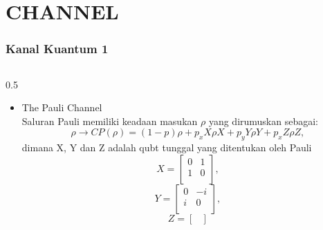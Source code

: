 \section{CHANNEL} %

\begin{frame}
    \frametitle{Kanal Kuantum 1}
  \begin{columns} %
    \begin{column}{0.5\textwidth}\vspace{-0.5cm}
      \justifying %
      \small %
        \begin{itemize}
            \item The Pauli Channel\\
                \fontsize{4}{6}\selectfont \justifying
                Saluran Pauli memiliki keadaan masukan $\rho$ yang dirumuskan sebagai:
                    \begin{equation}
                        \rho \rightarrow CP(\rho) = (1 - p)\rho + p_x X\rho X + p_y Y\rho Y + p_x Z\rho Z,
                    \end{equation}
                dimana X, Y dan Z adalah qubt tunggal yang ditentukan oleh Pauli  
                    \begin{equation}
                        X = \begin{bmatrix}
                        0 & 1 \\
                        1 & 0 \\
                        \end{bmatrix},
                    \end{equation}
                    \begin{equation}
                        Y = \begin{bmatrix}
                        0 & -i \\
                        i & 0 \\
                        \end{bmatrix},
                    \end{equation}            
                    \begin{equation}
                        Z = \begin{bmatrix}

\end{bmatrix}
\end{equation}
\end{itemize}
\end{column}
\end{columns}
\end{frame}
